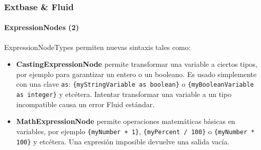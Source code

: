 
\begin{frame}[fragile]
	\frametitle{Extbase \& Fluid}
	\framesubtitle{ExpressionNodes (2)}

	ExpressionNodeTypes permiten nuevas sintaxis tales como:

	\begin{itemize}

		\item \textbf{CastingExpressionNode}\newline
			\small
				permite transformar una variable a ciertos tipos, por ejemplo para garantizar
				un entero o un booleano. Es usado simplemente con una clave \texttt{as}:
				\texttt{\{myStringVariable as boolean\}} o
				\texttt{\{myBooleanVariable as integer\}} y etcétera.
				Intentar transformar una variable a un tipo incompatible causa un error
				Fluid estándar.
			\normalsize

		\item \textbf{MathExpressionNode}\newline
			\small
				permite operaciones matemáticas básicas en variables, por ejemplo
				\texttt{\{myNumber + 1\}}, \texttt{\{myPercent / 100\}} o
				\texttt{\{myNumber * 100\}} y etcétera.
				Una expresión imposible devuelve una salida vacía.
			\normalsize

	\end{itemize}

\end{frame}


